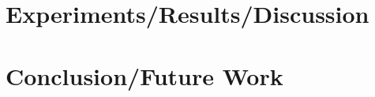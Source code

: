 \documentclass[10]{article}
\begin{document}
\section*{Experiments/Results/Discussion}

\section*{Conclusion/Future Work}

\end{document}
